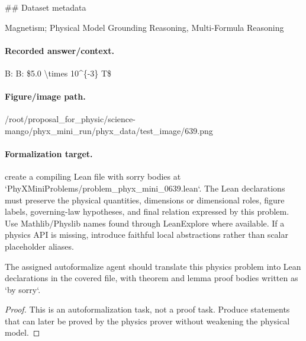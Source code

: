 \#\# Dataset metadata

Magnetism; Physical Model Grounding Reasoning, Multi-Formula Reasoning

\paragraph{Recorded answer/context.}
B: B: \$5.0 \textbackslash{}times 10\textasciicircum{}\{-3\} T\$

\paragraph{Figure/image path.}
/root/proposal\_for\_physic/science-mango/phyx\_mini\_run/phyx\_data/test\_image/639.png

\paragraph{Formalization target.}
create a compiling Lean file with sorry bodies at `PhyXMiniProblems/problem\_phyx\_mini\_0639.lean`. The Lean declarations must preserve the physical quantities, dimensions or dimensional roles, figure labels, governing-law hypotheses, and final relation expressed by this problem.
Use Mathlib/Physlib names found through LeanExplore where available. If a physics API is missing, introduce faithful local abstractions rather than scalar placeholder aliases.

\begin{theorem}
\label{thm:physics:phyx_mini_0639:target}
The assigned autoformalize agent should translate this physics problem into Lean declarations in the covered file, with theorem and lemma proof bodies written as `by sorry`.
\end{theorem}
\begin{proof}
This is an autoformalization task, not a proof task. Produce statements that can later be proved by the physics prover without weakening the physical model.
\end{proof}

